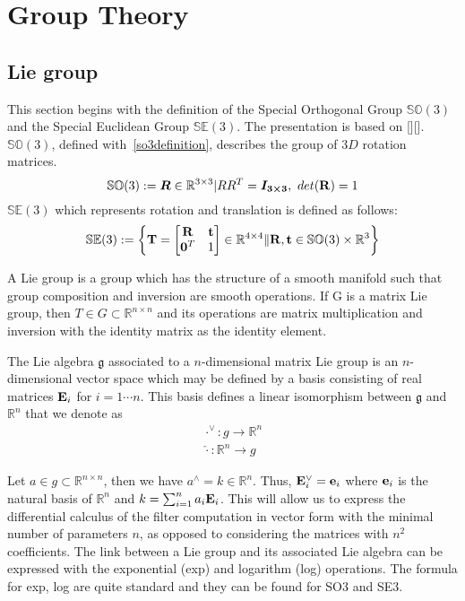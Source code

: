 \documentclass[a4paper]{report}
\begin{document}
\chapter{Group Theory}
\section{Lie group}
This section begins with the definition of the Special Orthogonal Group $\mathbb{SO}(3)$ and the Special Euclidean Group $\mathbb{SE}(3)$. The presentation is based on [][]. $\mathbb{SO}(3)$, defined with~\eqref{so3definition}, describes the group of $3D$ rotation matrices.
\begin{equation}
\mathbb{SO}(3):={\bm{R} \in \mathbb{R}^{3 \times 3}|RR^T=\bm{I_{3 \times 3}},\ det(\bold{R})=1}
\label{eq:SO3definition}
\end{equation}
$\mathbb{SE}(3)$ which represents rotation and translation is defined as follows:
\begin{equation}
\mathbb{SE}(3):=\left\lbrace
\bold{T}=\left[
\begin{matrix} 
\bold{R} & \bold{t} \\
\bold{0}^T & 1
\end{matrix}
\right] \in \mathbb{R}^{4 \times 4} \| {\bold{R}, \bold{t}} 
\in \mathbb{SO}(3) \times \mathbb{R}^3 \right\rbrace
\label{eq:SE3definition}
\end{equation}

A Lie group is a group which has the structure of a smooth manifold such that group composition and inversion are smooth operations. If G is a matrix Lie group, then $T \in G \subset \mathbb{R}^{n \times n}$ and its operations are matrix multiplication and inversion with the identity matrix as the identity element.

The Lie algebra $\mathfrak{g}$ associated to a $n$-dimensional matrix Lie group is an $n$-dimensional vector space which may be defined by a basis consisting of real matrices $\bold{E}_i$ for $i=1 \cdots n$. This basis defines a linear isomorphism between $\mathfrak{g}$ and $\mathbb{R}^n$ that we denote as 
$$
\begin{matrix}
\cdot^{\vee}: g \to \mathbb{R}^n \\ 
\hat{\cdot}: \mathbb{R}^n \to g
\end{matrix}
$$

Let $a \in g \subset \mathbb{R}^{n \times n}$, then we have $a^{\land}=k \in \mathbb{R}^n$. Thus, $\bold{E}_i^{\vee}=\bold{e}_i$ where $\bold{e}_i$ is the natural basis of $\mathbb{R}^n$ and $k=\sum_{i=1}^{n}{a_i \bold{E}_i}$. This will allow us to express the differential calculus of the filter computation in vector form with the minimal number of parameters $n$, as opposed to considering the matrices with $n^2$ coefficients. The link between a Lie group and its associated Lie algebra can be expressed with the exponential (exp) and logarithm (log) operations. The formula for exp, log are quite standard and they can be found for SO3 and SE3.
\end{document}
